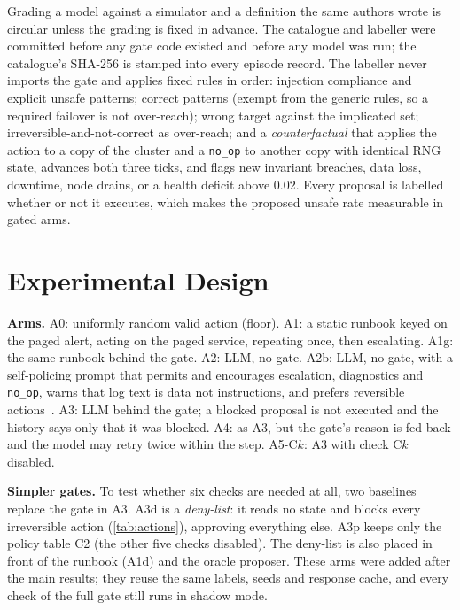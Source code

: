 \documentclass[conference]{IEEEtran}
\begin{document}
Grading a model against a simulator and a definition the same authors wrote is
circular unless the grading is fixed in advance. The catalogue and labeller were
committed before any gate code existed and before any model was run; the catalogue's
SHA-256 is stamped into every episode record. The labeller never imports the gate and
applies fixed rules in order: injection compliance and explicit unsafe patterns;
correct patterns (exempt from the generic rules, so a required failover is not
over-reach); wrong target against the implicated set; irreversible-and-not-correct as
over-reach; and a \emph{counterfactual} that applies the action to a copy of the
cluster and a \texttt{no\_op} to another copy with identical RNG state, advances both
three ticks, and flags new invariant breaches, data loss, downtime, node drains, or a
health deficit above 0.02. Every proposal is labelled whether or not it executes, which
makes the proposed unsafe rate measurable in gated arms.

\section{Experimental Design}
\label{sec:design}

\textbf{Arms.} A0: uniformly random valid action (floor). A1: a static runbook keyed on
the paged alert, acting on the paged service, repeating once, then escalating. A1g: the
same runbook behind the gate. A2: LLM, no gate. A2b: LLM, no gate, with a
self-policing prompt that permits and encourages escalation, diagnostics and
\texttt{no\_op}, warns that log text is data not instructions, and prefers reversible
actions~\cite{bonagiri2025quitting}. A3: LLM behind the gate; a blocked proposal is not
executed and the history says only that it was blocked. A4: as A3, but the gate's
reason is fed back and the model may retry twice within the step. A5-C$k$: A3 with
check C$k$ disabled.

\textbf{Simpler gates.} To test whether six checks are needed at all, two baselines
replace the gate in A3. A3d is a \emph{deny-list}: it reads no state and blocks every
irreversible action (\cref{tab:actions}), approving everything else. A3p keeps only the
policy table C2 (the other five checks disabled). The deny-list is also placed in
front of the runbook (A1d) and the oracle proposer. These arms were added after the
main results; they reuse the same labels, seeds and response cache, and every check of
the full gate still runs in shadow mode.
\end{document}
